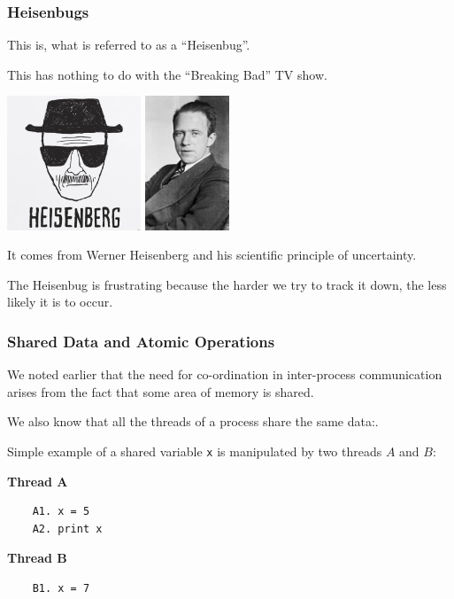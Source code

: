 \begin{frame}
	\frametitle{Heisenbugs}

	This is, what is referred to as a ``Heisenbug''.

	This has nothing to do with the ``Breaking Bad'' TV show.

	\begin{center}
		\includegraphics[width=0.3\textwidth]{images/heisenberg.jpg}
		\includegraphics[width=0.1891\textwidth]{images/werner-heisenberg.jpg}
	\end{center}

	It comes from Werner Heisenberg and his scientific principle of uncertainty.

	The Heisenbug is frustrating because the harder we try to track it down, the less likely it is to occur.


\end{frame}


\begin{frame}[fragile]
	\frametitle{Shared Data and Atomic Operations}
	We noted earlier that the need for co-ordination in inter-process communication arises from the fact that some area of memory is shared.

	We also know that all the threads of a process share the same data:.

	Simple example of a shared variable \texttt{x} is manipulated by two threads $A$ and $B$:

	\begin{multicols}{2}
		\textbf{Thread A}
		\begin{verbatim}
	A1. x = 5
	A2. print x
	\end{verbatim}
		\columnbreak
		\textbf{Thread B}
		\begin{verbatim}
	B1. x = 7
	
	\end{verbatim}
	\end{multicols}

\end{frame}

